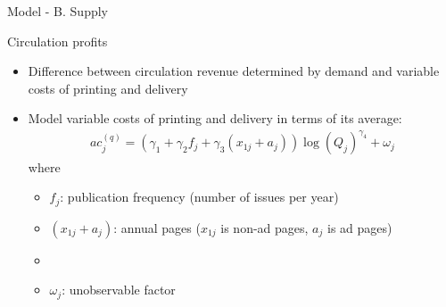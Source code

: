 \documentclass[aspectratio=169]{beamer}
\begin{document}
\begin{frame}{Model - B. Supply}
	
	\uncover<+->{}

	\begin{block}{Circulation profits}
		\begin{itemize}
			\item Difference between circulation revenue determined by demand and variable costs of printing and delivery
			\item Model variable costs of printing and delivery in terms of its average: 
			\begin{align}
				ac_{j}^{(q)} = \left(\gamma_1 + \gamma_2 f_j + \gamma_3 (x_{1j} + a_j) \right) \log(Q_j)^{\gamma_4} + \omega_j
			\end{align}
			where
			\begin{itemize}
				\item $f_j$: publication frequency (number of issues per year)
				\item $(x_{1j} + a_j)$: annual pages ($x_{1j}$ is non-ad pages, $a_j$ is ad pages)
				\item {}
				\item $\omega_j$: unobservable factor
			\end{itemize}
		\end{itemize}
	\end{block}


\end{frame}
\end{document}
